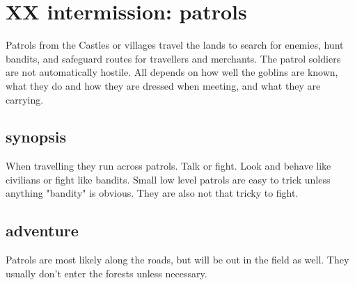 
















\clearpage
\section*{XX intermission: patrols}


Patrols from the Castles or villages travel the lands to search for enemies, hunt bandits, and safeguard routes for travellers and merchants. The patrol soldiers are not automatically hostile. All depends on how well the goblins are known, what they do and how they are dressed when meeting, and what they are carrying.


\subsection*{synopsis}

When travelling they run across patrols. Talk or fight. Look and behave like civilians or fight like bandits. Small low level patrols are easy to trick unless anything "bandity" is obvious. They are also not that tricky to fight.


\subsection*{adventure}

Patrols are most likely along the roads, but will be out in the field as well. They usually don't enter the forests unless necessary.


